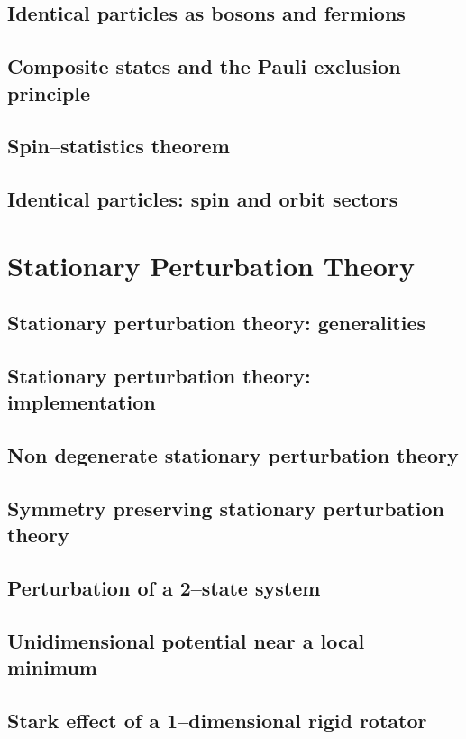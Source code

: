 \documentclass{article}
\begin{document}
\subsection{Identical particles as bosons and fermions}
\subsection{Composite states and the Pauli exclusion principle}
\subsection{Spin–statistics theorem}
\subsection{Identical particles: spin and orbit sectors}

\section{Stationary Perturbation Theory}
\subsection{Stationary perturbation theory: generalities}
\subsection{Stationary perturbation theory: implementation}
\subsection{Non degenerate stationary perturbation theory}
\subsection{Symmetry preserving stationary perturbation theory}
\subsection{Perturbation of a 2–state system}
\subsection{Unidimensional potential near a local minimum}
\subsection{Stark effect of a 1–dimensional rigid rotator}
\end{document}
